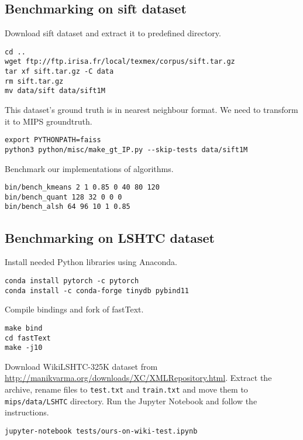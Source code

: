 \subsection{Benchmarking on sift dataset}
\noindent
Download sift dataset and extract it to predefined directory.
\begin{verbatim}
cd ..
wget ftp://ftp.irisa.fr/local/texmex/corpus/sift.tar.gz
tar xf sift.tar.gz -C data
rm sift.tar.gz
mv data/sift data/sift1M
\end{verbatim}
This dataset's ground truth is in nearest neighbour format.
We need to transform it to MIPS groundtruth.
\begin{verbatim}
export PYTHONPATH=faiss
python3 python/misc/make_gt_IP.py --skip-tests data/sift1M
\end{verbatim}
Benchmark our implementations of algorithms.
\begin{verbatim}
bin/bench_kmeans 2 1 0.85 0 40 80 120
bin/bench_quant 128 32 0 0 0
bin/bench_alsh 64 96 10 1 0.85
\end{verbatim}
\subsection{Benchmarking on LSHTC dataset}
\noindent
Install needed Python libraries using Anaconda.
\begin{verbatim}
conda install pytorch -c pytorch
conda install -c conda-forge tinydb pybind11
\end{verbatim}
Compile bindings and fork of fastText.
\begin{verbatim}
make bind
cd fastText
make -j10
\end{verbatim}
Download WikiLSHTC-325K dataset from \url{http://manikvarma.org/downloads/XC/XMLRepository.html}.
Extract the archive, rename files to \texttt{test.txt} and \texttt{train.txt} and move them to \texttt{mips/data/LSHTC} directory.
Run the Jupyter Notebook and follow the instructions.
\begin{verbatim}
jupyter-notebook tests/ours-on-wiki-test.ipynb 
\end{verbatim}
